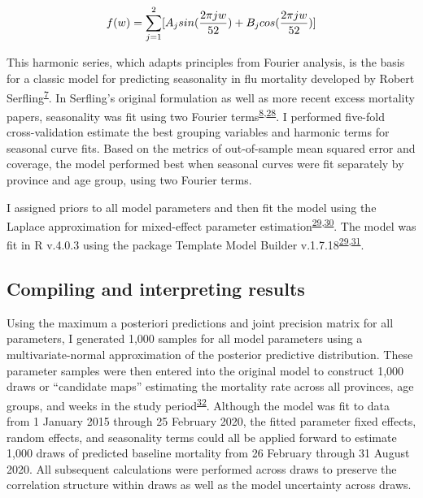 \documentclass[
]{article}
\begin{document}
\[f(w) = \large\sum_{j=1}^{2}[A_{j}sin(\frac{2\pi j w}{52}) + B_{j}cos(\frac{2\pi j w}{52})]\]

This harmonic series, which adapts principles from Fourier analysis, is the basis for a classic model for predicting seasonality in flu mortality developed by Robert Serfling\textsuperscript{\protect\hyperlink{ref-Serfling1963}{7}}⁠. In Serfling's original formulation as well as more recent excess mortality papers, seasonality was fit using two Fourier terms\textsuperscript{\protect\hyperlink{ref-Weinberger2020a}{8},\protect\hyperlink{ref-Woolf2020}{28}}⁠. I performed five-fold cross-validation estimate the best grouping variables and harmonic terms for seasonal curve fits. Based on the metrics of out-of-sample mean squared error and coverage, the model performed best when seasonal curves were fit separately by province and age group, using two Fourier terms.

I assigned priors to all model parameters and then fit the model using the Laplace approximation for mixed-effect parameter estimation\textsuperscript{\protect\hyperlink{ref-Kristensen2016}{29},\protect\hyperlink{ref-Thorson2016}{30}}⁠. The model was fit in R v.4.0.3 using the package Template Model Builder v.1.7.18\textsuperscript{\protect\hyperlink{ref-Kristensen2016}{29},\protect\hyperlink{ref-RCoreTeam2018}{31}}.

\hypertarget{compiling-and-interpreting-results}{%
\subsection{Compiling and interpreting results}\label{compiling-and-interpreting-results}}

Using the maximum a posteriori predictions and joint precision matrix for all parameters, I generated 1,000 samples for all model parameters using a multivariate-normal approximation of the posterior predictive distribution. These parameter samples were then entered into the original model to construct 1,000 draws or ``candidate maps'' estimating the mortality rate across all provinces, age groups, and weeks in the study period\textsuperscript{\protect\hyperlink{ref-Patil2011}{32}}⁠. Although the model was fit to data from 1 January 2015 through 25 February 2020, the fitted parameter fixed effects, random effects, and seasonality terms could all be applied forward to estimate 1,000 draws of predicted baseline mortality from 26 February through 31 August 2020. All subsequent calculations were performed across draws to preserve the correlation structure within draws as well as the model uncertainty across draws.
\end{document}
